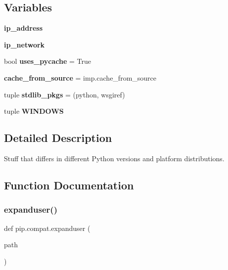 \subsection*{Variables}
\begin{DoxyCompactItemize}
\item 
\mbox{\label{namespacepip_1_1compat_aa7b751d7d447893ef652d18330fa02e1}} 
{\bfseries ip\+\_\+address}
\item 
\mbox{\label{namespacepip_1_1compat_a51c0b48ac04d28004c9f5d08e79aad58}} 
{\bfseries ip\+\_\+network}
\item 
\mbox{\label{namespacepip_1_1compat_abbfe8d1703220250cd65b656527ac4cb}} 
bool {\bfseries uses\+\_\+pycache} = True
\item 
\mbox{\label{namespacepip_1_1compat_ac3011d4ad9567584104e33b22d4e8e04}} 
{\bfseries cache\+\_\+from\+\_\+source} = imp.\+cache\+\_\+from\+\_\+source
\item 
\mbox{\label{namespacepip_1_1compat_a4d53caae375ba90f683d1e461e465046}} 
tuple {\bfseries stdlib\+\_\+pkgs} = (\textquotesingle{}python\textquotesingle{}, \textquotesingle{}wsgiref\textquotesingle{})
\item 
tuple {\bfseries W\+I\+N\+D\+O\+WS}
\end{DoxyCompactItemize}


\subsection{Detailed Description}
\begin{DoxyVerb}Stuff that differs in different Python versions and platform
distributions.\end{DoxyVerb}
 

\subsection{Function Documentation}
\mbox{\label{namespacepip_1_1compat_a5e0a7eada370641692bafb5d19cd08a2}} 
\subsubsection{\texorpdfstring{expanduser()}{expanduser()}}
{\footnotesize\ttfamily def pip.\+compat.\+expanduser (\begin{DoxyParamCaption}\item[{}]{path }\end{DoxyParamCaption})}

